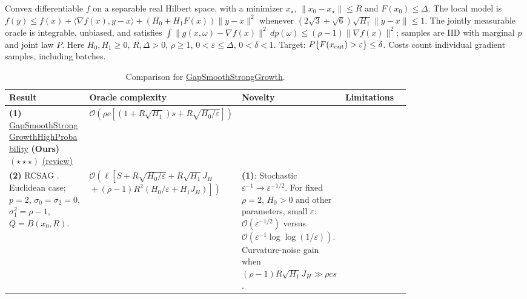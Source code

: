 \begin{table}[tp]
\centering
\caption{Comparison for \href{https://github.com/k3nfalt/longtails/blob/main/LongTails/Setups/GapSmoothStrongGrowth.lean}{GapSmoothStrongGrowth}.}\label{tab:GapSmoothStrongGrowth}
\parbox{\linewidth}{\footnotesize Convex differentiable $f$ on a separable real Hilbert space, with a minimizer $x_\star$, $\|x_0-x_\star\|\le R$ and $F(x_0)\le\Delta$. The local model is $f(y)\le f(x)+\langle\nabla f(x),y-x\rangle+(H_0+H_1F(x))\|y-x\|^2$ whenever $(2\sqrt3+\sqrt6)\sqrt{H_1}\|y-x\|\le1$. The jointly measurable oracle is integrable, unbiased, and satisfies $\int\|g(x,\omega)-\nabla f(x)\|^2\,dp(\omega)\le(\rho-1)\|\nabla f(x)\|^2$; samples are IID with marginal $p$ and joint law $P$. Here $H_0,H_1\ge0$, $R,\Delta>0$, $\rho\ge1$, $0<\varepsilon\le\Delta$, $0<\delta<1$. Target: $P\{F(x_{\rm out})>\varepsilon\}\le\delta$. Costs count individual gradient samples, including batches.}\par\smallskip
\begin{threeparttable}
\footnotesize
\setlength{\tabcolsep}{4pt}\renewcommand{\arraystretch}{1.25}
\begin{tabularx}{\linewidth}{@{}>{\raggedright\arraybackslash}p{0.20\linewidth}>{\raggedright\arraybackslash}p{0.32\linewidth}>{\raggedright\arraybackslash}p{0.25\linewidth}>{\raggedright\arraybackslash}X@{}}
\toprule
\textbf{Result} & \textbf{Oracle complexity} & \textbf{Novelty} & \textbf{Limitations} \\
\midrule
\textbf{(1)} \href{https://github.com/k3nfalt/longtails/blob/main/LongTails/Theorems/GapSmoothStrongGrowthHighProbability.lean}{Gap\allowbreak Smooth\allowbreak Strong\allowbreak Growth\allowbreak High\allowbreak Probability} \textbf{(Ours)} $(\star\star\star)$ \href{https://github.com/k3nfalt/longtails/blob/main/scripts/reviews/GapSmoothStrongGrowthHighProbability.md}{(review)}
& $\mathcal{O}\!\left(\rho c\left[(1+R\sqrt{H_1})s+R\sqrt{H_0/\varepsilon}\right]\right)$ & & \\
\midrule[1.2pt]
\textbf{(2)} RCSAG \citep[Thm.~9, v1]{gssgLobanov2026v1}. Euclidean case; $p=2$, $\sigma_0=\sigma_2=0$, $\sigma_1^2=\rho-1$, $Q=B(x_0,R)$.
& $\mathcal{O}\!\left(\ell\left[S+R\sqrt{H_0/\varepsilon}+R\sqrt{H_1}J_H\right.\right.$\newline
$\left.\left.{}+(\rho-1)R^2(H_0/\varepsilon+H_1J_H)\right]\right)$
& \textbf{(1)}: Stochastic $\varepsilon^{-1}\to\varepsilon^{-1/2}$. For fixed $\rho=2$, $H_0>0$ and other parameters, small $\varepsilon$: $\mathcal{O}(\varepsilon^{-1/2})$ versus $\mathcal{O}(\varepsilon^{-1}\log\log(1/\varepsilon))$. Curvature-noise gain when $(\rho-1)R\sqrt{H_1}J_H\gg\rho cs$.

\end{tabularx}
\end{threeparttable}
\end{table}
